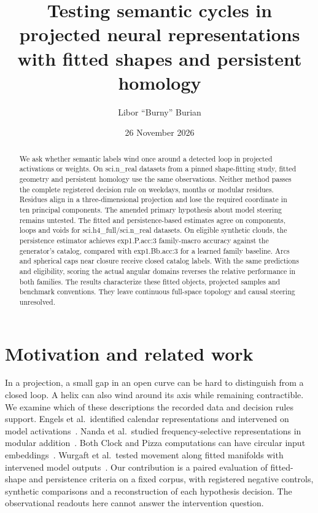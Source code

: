 \documentclass[10pt]{article}
\title{Testing semantic cycles in projected neural representations\\with fitted shapes and persistent homology}
\author{Libor \textquotedblleft Burny\textquotedblright{} Burian}
\date{26 November 2026}
\begin{document}
\maketitle

\begin{abstract}
We ask whether semantic labels wind once around a detected loop in projected activations or weights. On {{sci.n_real}} datasets from a pinned shape-fitting study, fitted geometry and persistent homology use the same observations. Neither method passes the complete registered decision rule on weekdays, months or modular residues. Residues align in a three-dimensional projection and lose the required coordinate in ten principal components. The amended primary hypothesis about model steering remains untested. The fitted and persistence-based estimates agree on components, loops and voids for {{sci.h4_full}}/{{sci.n_real}} datasets. On eligible synthetic clouds, the persistence estimator achieves {{exp1.P.acc:3}} family-macro accuracy against the generator's catalog, compared with {{exp1.Bb.acc:3}} for a learned family baseline. Arcs and spherical caps near closure receive closed catalog labels. With the same predictions and eligibility, scoring the actual angular domains reverses the relative performance in both families. The results characterize these fitted objects, projected samples and benchmark conventions. They leave continuous full-space topology and causal steering unresolved.
\end{abstract}

\section{Motivation and related work}

In a projection, a small gap in an open curve can be hard to distinguish from a closed loop. A helix can also wind around its axis while remaining contractible. We examine which of these descriptions the recorded data and decision rules support. Engels et al.\ identified calendar representations and intervened on model activations~\citep{engels2025notall}. Nanda et al.\ studied frequency-selective representations in modular addition~\citep{nanda2023progress}. Both Clock and Pizza computations can have circular input embeddings~\citep{zhong2023}. Wurgaft et al.\ tested movement along fitted manifolds with intervened model outputs~\citep{wurgaft2026manifold}. Our contribution is a paired evaluation of fitted-shape and persistence criteria on a fixed corpus, with registered negative controls, synthetic comparisons and a reconstruction of each hypothesis decision. The observational readouts here cannot answer the intervention question.
\end{document}
